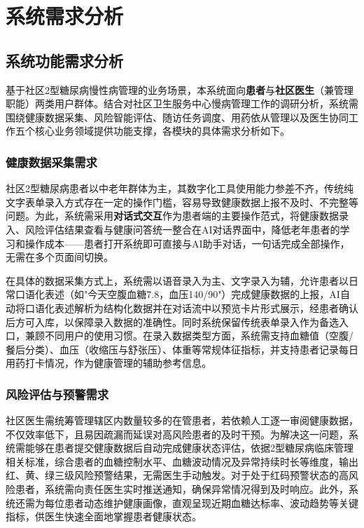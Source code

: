 \chapter{系统需求分析}

\section{系统功能需求分析}

基于社区2型糖尿病慢性病管理的业务场景，本系统面向\textbf{患者}与\textbf{社区医生}（兼管理职能）两类用户群体。结合对社区卫生服务中心慢病管理工作的调研分析，系统需围绕健康数据采集、风险智能评估、随访任务调度、用药依从管理以及医生协同工作五个核心业务领域提供功能支撑，各模块的具体需求分析如下。

\subsection{健康数据采集需求}

社区2型糖尿病患者以中老年群体为主，其数字化工具使用能力参差不齐，传统纯文字表单录入方式存在一定的操作门槛，容易导致健康数据上报不及时、不完整等问题。为此，系统需采用\textbf{对话式交互}作为患者端的主要操作范式，将健康数据录入、风险评估结果查看与健康问答统一整合在AI对话界面中，降低老年患者的学习和操作成本——患者打开系统即可直接与AI助手对话，一句话完成全部操作，无需在多个页面间切换。

在具体的数据采集方式上，系统需以语音录入为主、文字录入为辅，允许患者以日常口语化表述（如"今天空腹血糖7.8，血压140/90"）完成健康数据的上报，AI自动将口语化表述解析为结构化数据并在对话流中以预览卡片形式展示，经患者确认后方可入库，以保障录入数据的准确性。同时系统保留传统表单录入作为备选入口，兼顾不同用户的使用习惯。在录入数据类型方面，系统需支持血糖值（空腹/餐后分类）、血压（收缩压与舒张压）、体重等常规体征指标，并支持患者记录每日用药打卡情况，作为健康管理的辅助参考信息。

\subsection{风险评估与预警需求}

社区医生需统筹管理辖区内数量较多的在管患者，若依赖人工逐一审阅健康数据，不仅效率低下，且易因疏漏而延误对高风险患者的及时干预。为解决这一问题，系统需能够在患者提交健康数据后自动完成健康状态评估，依据2型糖尿病临床管理相关标准，综合患者的血糖控制水平、血糖波动情况及异常持续时长等维度，输出红、黄、绿三级风险预警结果，无需医生手动触发。对于处于红码预警状态的高风险患者，系统需向责任医生实时推送通知，确保异常情况得到及时响应。此外，系统还需为每位患者动态维护健康画像，直观呈现近期血糖达标率、波动趋势等关键指标，供医生快速全面地掌握患者健康状态。

